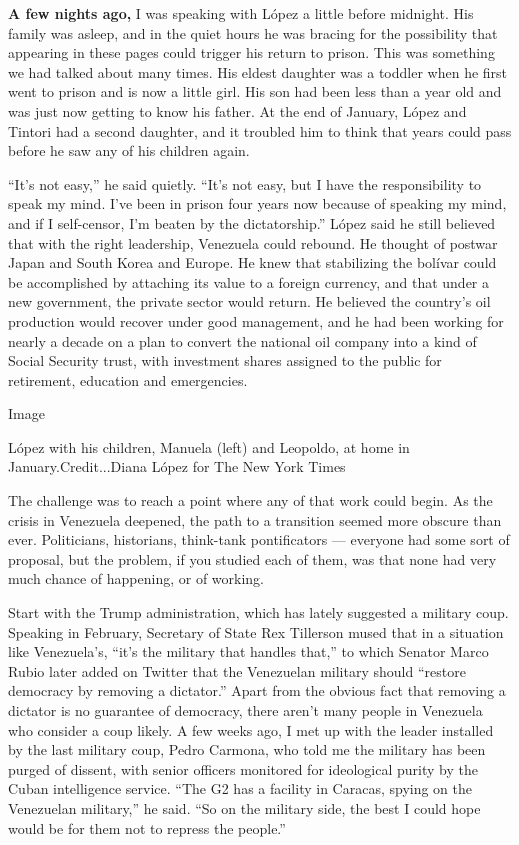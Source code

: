 \textbf{A few nights ago,} I was speaking with López a little before
midnight. His family was asleep, and in the quiet hours he was bracing
for the possibility that appearing in these pages could trigger his
return to prison. This was something we had talked about many times. His
eldest daughter was a toddler when he first went to prison and is now a
little girl. His son had been less than a year old and was just now
getting to know his father. At the end of January, López and Tintori had
a second daughter, and it troubled him to think that years could pass
before he saw any of his children again.

``It's not easy,'' he said quietly. ``It's not easy, but I have the
responsibility to speak my mind. I've been in prison four years now
because of speaking my mind, and if I self-censor, I'm beaten by the
dictatorship.'' López said he still believed that with the right
leadership, Venezuela could rebound. He thought of postwar Japan and
South Korea and Europe. He knew that stabilizing the bolívar could be
accomplished by attaching its value to a foreign currency, and that
under a new government, the private sector would return. He believed the
country's oil production would recover under good management, and he had
been working for nearly a decade on a plan to convert the national oil
company into a kind of Social Security trust, with investment shares
assigned to the public for retirement, education and emergencies.

Image

López with his children, Manuela (left) and Leopoldo, at home in
January.Credit...Diana López for The New York Times

The challenge was to reach a point where any of that work could begin.
As the crisis in Venezuela deepened, the path to a transition seemed
more obscure than ever. Politicians, historians, think-tank
pontificators --- everyone had some sort of proposal, but the problem,
if you studied each of them, was that none had very much chance of
happening, or of working.

Start with the Trump administration, which has lately suggested a
military coup. Speaking in February, Secretary of State Rex Tillerson
mused that in a situation like Venezuela's, ``it's the military that
handles that,'' to which Senator Marco Rubio later added on Twitter that
the Venezuelan military should ``restore democracy by removing a
dictator.'' Apart from the obvious fact that removing a dictator is no
guarantee of democracy, there aren't many people in Venezuela who
consider a coup likely. A few weeks ago, I met up with the leader
installed by the last military coup, Pedro Carmona, who told me the
military has been purged of dissent, with senior officers monitored for
ideological purity by the Cuban intelligence service. ``The G2 has a
facility in Caracas, spying on the Venezuelan military,'' he said. ``So
on the military side, the best I could hope would be for them not to
repress the people.''

